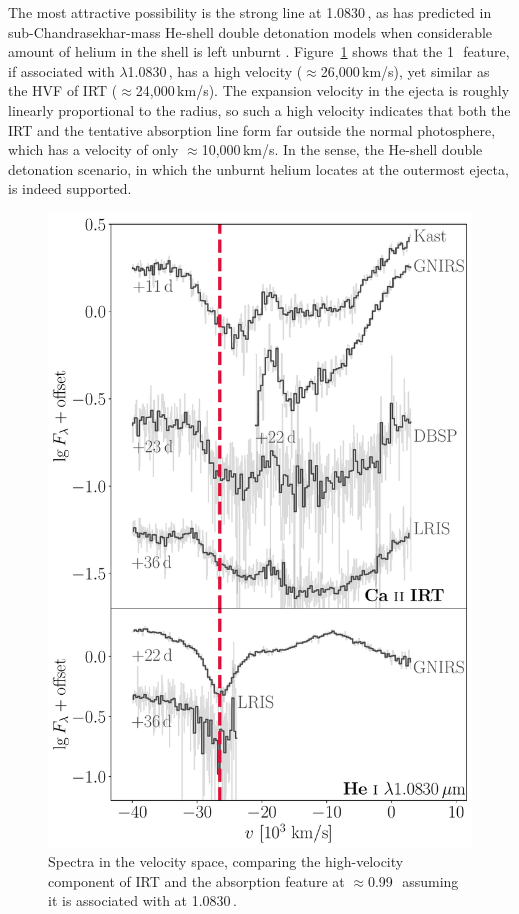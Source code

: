 \documentclass[twocolumn]{aastex631}
\begin{document}
The most attractive possibility is the strong  line at 1.0830\,\micron, as has predicted in sub-Chandrasekhar-mass He-shell double detonation models when considerable amount of helium in the shell is left unburnt \citep{Boyle2017_Helium}. Figure~\ref{fig:hvf_comp} shows that the 1\,\micron\ feature, if associated with  $\lambda$1.0830\,\micron, has a high velocity ($\approx$26,000\,km/s), yet similar as the HVF of  IRT ($\approx$24,000\,km/s). The expansion velocity in the ejecta is roughly linearly proportional to the radius, so such a high velocity indicates that both the  IRT and the tentative  absorption line form far outside the normal photosphere, which has a velocity of only $\approx$10,000\,km/s. In the sense, the He-shell double detonation scenario, in which the unburnt helium locates at the outermost ejecta, is indeed supported.
\begin{figure}
    \centering
    \includegraphics[width=\linewidth]{CaII_HeI_hvf.pdf}
    \caption{Spectra in the velocity space, comparing the high-velocity component of  IRT and the absorption feature at $\approx$0.99\,\micron\ assuming it is associated with  at 1.0830\,\micron.}
    \label{fig:hvf_comp}
\end{figure}
\end{document}

